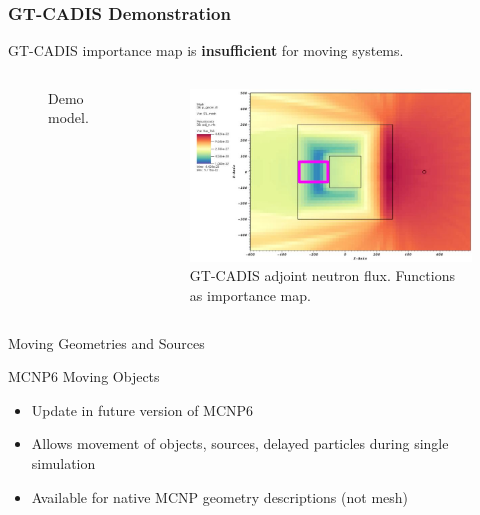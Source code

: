 \documentclass{beamer}
\begin{document}
\begin{frame}
\frametitle{GT-CADIS Demonstration}
	GT-CADIS importance map is \textbf{insufficient} for moving systems.

	\begin{columns}
        \begin{figure}
	\vspace{-0.9cm}
		\hspace{-1cm}
		\caption{Demo model.}
        \end{figure}

        \begin{figure}
	\centering
	\includegraphics[scale=0.20]{gtcadis_adjn_hi.jpg}
		\caption{GT-CADIS adjoint neutron flux. Functions as importance
		map.}
	\end{figure}
	\end{columns}

\end{frame}

\begin{frame}{Moving Geometries and Sources}
	\begin{block}{MCNP6 Moving Objects}
	\begin{itemize}
		\item{Update in future version of MCNP6}
		\item{Allows movement of objects, sources, delayed particles
			during single simulation}
		\item{Available for native MCNP geometry descriptions (not
			mesh)}
	\end{itemize}
	\end{block}
\end{frame}
\end{document}
